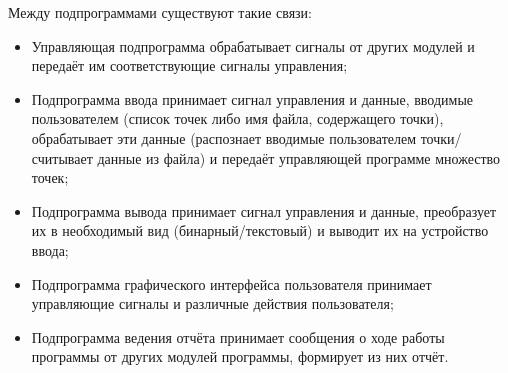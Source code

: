 \documentclass[a4paper,12pt,notitlepage,headsepline,pdftex]{scrartcl}
\begin{document}
Между подпрограммами существуют такие связи:
\begin{itemize}
  \item Управляющая подпрограмма обрабатывает сигналы от других модулей и
    передаёт им соответствующие сигналы управления;
  \item Подпрограмма ввода принимает сигнал управления и данные, вводимые
    пользователем (список точек либо имя файла, содержащего точки),
    обрабатывает эти данные (распознает вводимые пользователем точки/считывает
    данные из файла) и передаёт управляющей программе множество точек;
  \item Подпрограмма вывода принимает сигнал управления и данные, преобразует
    их в необходимый вид (бинарный/текстовый) и выводит их на устройство
    ввода;
  \item Подпрограмма графического интерфейса пользователя принимает
    управляющие сигналы и различные действия пользователя;
  \item Подпрограмма ведения отчёта принимает сообщения о ходе работы
    программы от других модулей программы, формирует из них отчёт.
\end{itemize}
\end{document}
